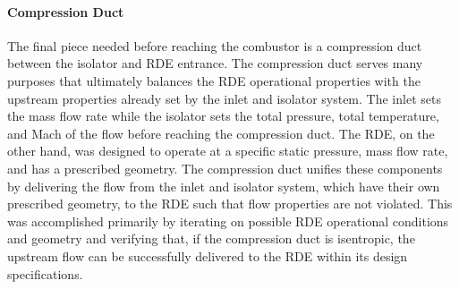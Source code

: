 \paragraph{Compression Duct}

    The final piece needed before reaching the combustor is a compression duct between the isolator and RDE entrance. The compression duct serves many purposes that ultimately balances the RDE operational properties with the upstream properties already set by the inlet and isolator system. The inlet sets the mass flow rate while the isolator sets the total pressure, total temperature, and Mach of the flow before reaching the compression duct. The RDE, on the other hand, was designed to operate at a specific static pressure, mass flow rate, and has a prescribed geometry. The compression duct unifies these components by delivering the flow from the inlet and isolator system, which have their own prescribed geometry, to the RDE such that flow properties are not violated. This was accomplished primarily by iterating on possible RDE operational conditions and geometry and verifying that, if the compression duct is isentropic, the upstream flow can be successfully delivered to the RDE within its design specifications. 
